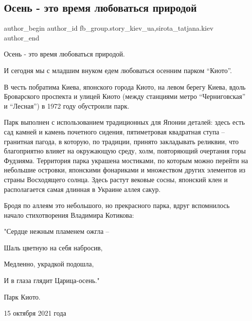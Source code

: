  
 
 
 
 
 
\subsection{Осень - это время  любоваться природой}
\label{sec:16_10_2021.fb.fb_group.story_kiev_ua.2.osenj_park_kioto}
 
\ifcmt
 author_begin
   author_id fb_group.story_kiev_ua,sirota_tatjana.kiev
 author_end
\fi

Осень - это время любоваться природой.

И сегодня мы с младшим внуком едем любоваться осенним парком \enquote{Киото}.

В честь побратима Киева, японского города Киото, на левом берегу Киева, вдоль
Броварского проспекта и улицей Киото (между станциями метро \enquote{Черниговская} и
\enquote{Лесная}) в 1972  году обустроили парк.

Парк выполнен с использованием традиционных для Японии деталей: здесь есть сад
камней и камень почетного сидения, пятиметровая квадратная ступа – гранитная
пагода, в которую, по традиции, принято закладывать реликвии, что благоприятно
влияет на окружающую среду, холм, повторяющий очертания горы Фудзияма.
Территория парка украшена мостиками, по которым можно перейти на небольшие
островки, японскими фонариками и множеством других элементов из страны
Восходящего солнца. Здесь растут вековые сосны, японский клен и располагается
самая длинная в Украине аллея сакур.

Бродя по аллеям это небольшого, но прекрасного парка, вдруг вспомнилось начало
стихотворения Владимира Котикова:

"Сердце нежным пламенем ожгла –

Шаль цветную на себя набросив,

Медленно, украдкой подошла,

И в глаза глядит Царица-осень."

Парк Киото.

15 октября 2021 года 

\begin{multicols}{2} %
\setlength{\parindent}{0pt}
\end{multicols} %

